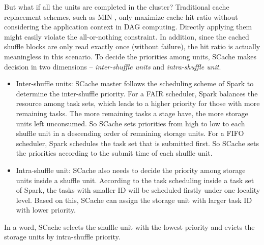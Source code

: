 But what if all the units are completed in the cluster? Traditional cache replacement schemes, such as MIN \cite{min}, only maximize cache hit ratio without considering the application context in DAG computing.
Directly applying them might easily violate the all-or-nothing constraint.
In addition, since the cached shuffle blocks are only read exactly once (without failure), the hit ratio is actually meaningless in this scenario.
To decide the priorities among units, SCache makes decision in two dimensions -- \textit{inter-shuffle units} and \textit{intra-shuffle unit}.
\begin{itemize}[noitemsep]
	\item Inter-shuffle units: SCache master follows the scheduling scheme of Spark to determine the inter-shuffle priority. For a FAIR scheduler, Spark balances the resource among task sets, which leads to a higher priority for those with more remaining tasks. The more remaining tasks a stage have, the more storage units left unconsumed. So SCache sets priorities from high to low to each shuffle unit in a descending order of remaining storage units. For a FIFO scheduler, Spark schedules the task set that is submitted first. So SCache sets the priorities according to the submit time of each shuffle unit.
	\item Intra-shuffle unit: SCache also needs to decide the priority among storage units inside a shuffle unit. According to the task scheduling inside a task set of Spark, the tasks with smaller ID will be scheduled firstly under one locality level. Based on this, SCache can assign the storage unit with larger task ID with lower priority.
\end{itemize}
In a word, SCache selects the shuffle unit with the lowest priority and evicts the storage units by intra-shuffle priority.



